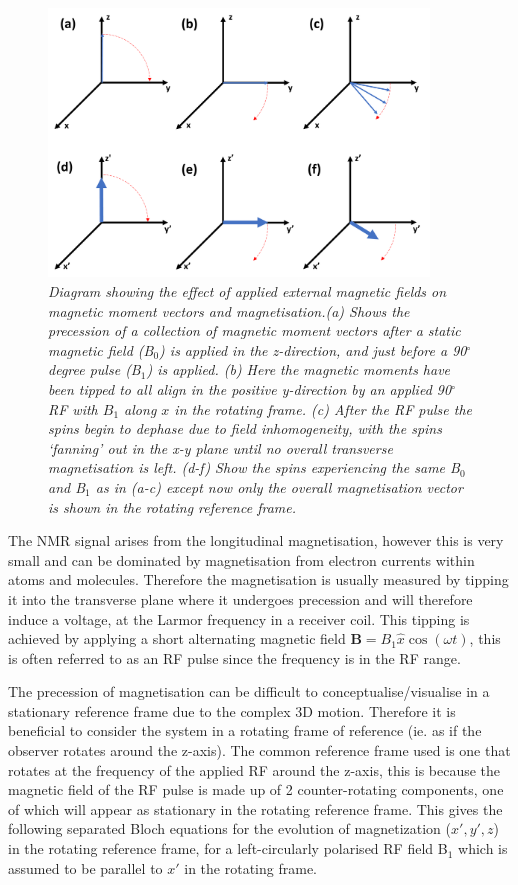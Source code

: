 \begin{figure}
    \centering
    \includegraphics[width=0.9\textwidth]{Figures/Theory/Magnetisation.png}
    \caption{\textit{Diagram showing the effect of applied external magnetic fields on magnetic moment vectors and magnetisation.(a) Shows the precession of a collection of magnetic moment vectors after a static magnetic field (B$_0$) is applied in the z-direction, and just before a 90$^\circ$ degree pulse (B$_1$) is applied. (b) Here the magnetic moments have been tipped to all align in the positive y-direction by an applied 90$^\circ$ \ac{RF} with $B_1$ along $x$ in the rotating frame. (c) After the \ac{RF} pulse the spins begin to dephase due to field inhomogeneity, with the spins `fanning' out in the x-y plane until no overall transverse magnetisation is left. (d-f) Show the spins experiencing the same B$_0$ and B$_1$ as in (a-c) except now only the overall magnetisation vector is shown in the rotating reference frame.}}
    \label{fig:theory:Mag}
\end{figure}


The \ac{NMR} signal arises from the longitudinal magnetisation, however this is very small and can be dominated by magnetisation from electron currents within atoms and molecules. Therefore the magnetisation is usually measured by tipping it into the transverse plane where it undergoes precession and will therefore induce a voltage, at the Larmor frequency in a receiver coil. This tipping is achieved by applying a short alternating magnetic field $\mathbf{B} = B_1\hat{x}\cos (\omega t)$, this is often referred to as an \ac{RF} pulse since the frequency is in the \ac{RF} range.

The precession of magnetisation can be difficult to conceptualise/visualise in a stationary reference frame due to the complex 3D motion. Therefore it is beneficial to consider the system in a rotating frame of reference (ie. as if the observer rotates around the z-axis). The common reference frame used is one that rotates at the frequency of the applied \ac{RF} around the z-axis, this is because the magnetic field of the \ac{RF} pulse is made up of 2 counter-rotating components, one of which will appear as stationary in the rotating reference frame. This gives the following separated Bloch equations for the evolution of magnetization ($x',y',z$) in the rotating reference frame, for a left-circularly polarised \ac{RF} field B$_1$ which is assumed to be parallel to $x'$ in the rotating frame.

